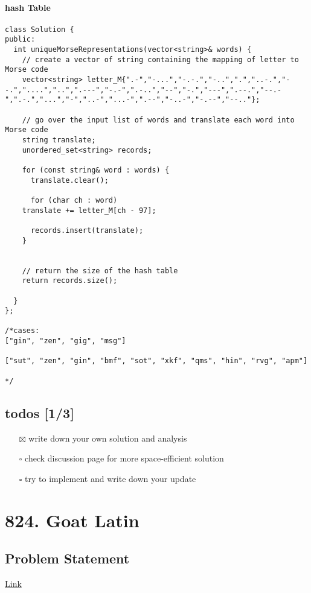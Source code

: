 \documentclass[11pt]{article}
\begin{document}
\paragraph{hash Table}
\label{sec:org8b9e9c0}
\begin{verbatim}
class Solution {
public:
  int uniqueMorseRepresentations(vector<string>& words) {
    // create a vector of string containing the mapping of letter to Morse code 
    vector<string> letter_M{".-","-...","-.-.","-..",".","..-.","--.","....","..",".---","-.-",".-..","--","-.","---",".--.","--.-",".-.","...","-","..-","...-",".--","-..-","-.--","--.."};

    // go over the input list of words and translate each word into Morse code
    string translate;
    unordered_set<string> records;

    for (const string& word : words) {
      translate.clear();

      for (char ch : word)
	translate += letter_M[ch - 97];

      records.insert(translate);
    }


    // return the size of the hash table 
    return records.size();

  }
};

/*cases: 
["gin", "zen", "gig", "msg"]

["sut", "zen", "gin", "bmf", "sot", "xkf", "qms", "hin", "rvg", "apm"]

*/
\end{verbatim}
\subsection{todos [1/3]}
\label{sec:orga446c37}
\begin{itemize}
\item[{$\boxtimes$}] write down your own solution and analysis
\item[{$\square$}] check discussion page for more space-efficient solution
\item[{$\square$}] try to implement and write down your update
\end{itemize}
\section{824. Goat Latin}
\label{sec:orgc5684c8}
\subsection{Problem Statement}
\label{sec:org510d777}
\href{https://leetcode.com/problems/goat-latin/}{Link}
\end{document}
